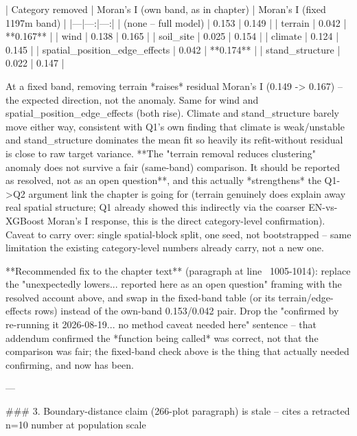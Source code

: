 | Category removed | Moran's I (own band, as in chapter) | Moran's I (fixed 1197m band) |
|---|---:|---:|
| (none -- full model) | 0.153 | 0.149 |
| terrain | 0.042 | **0.167** |
| wind | 0.138 | 0.165 |
| soil\_site | 0.025 | 0.154 |
| climate | 0.124 | 0.145 |
| spatial\_position\_edge\_effects | 0.042 | **0.174** |
| stand\_structure | 0.022 | 0.147 |

At a fixed band, removing terrain *raises* residual Moran's I (0.149 -> 0.167) -- the expected
direction, not the anomaly. Same for wind and spatial\_position\_edge\_effects (both rise).
Climate and stand\_structure barely move either way, consistent with Q1's own finding that
climate is weak/unstable and stand\_structure dominates the mean fit so heavily its refit-without
residual is close to raw target variance. **The "terrain removal reduces clustering" anomaly does
not survive a fair (same-band) comparison. It should be reported as resolved, not as an open
question**, and this actually *strengthens* the Q1->Q2 argument link the chapter is going for
(terrain genuinely does explain away real spatial structure; Q1 already showed this indirectly
via the coarser EN-vs-XGBoost Moran's I response, this is the direct category-level
confirmation). Caveat to carry over: single spatial-block split, one seed, not bootstrapped --
same limitation the existing category-level numbers already carry, not a new one.

**Recommended fix to the chapter text** (paragraph at line ~1005-1014): replace the
"unexpectedly lowers... reported here as an open question" framing with the resolved account
above, and swap in the fixed-band table (or its terrain/edge-effects rows) instead of the
own-band 0.153/0.042 pair. Drop the "confirmed by re-running it 2026-08-19... no method caveat
needed here" sentence -- that addendum confirmed the *function being called* was correct, not
that the comparison was fair; the fixed-band check above is the thing that actually needed
confirming, and now has been.

---

### 3. Boundary-distance claim (266-plot paragraph) is stale -- cites a retracted n=10 number at population scale

